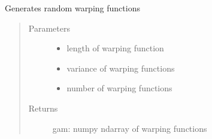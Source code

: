 \documentclass[letterpaper,10pt,english]{sphinxmanual}
\begin{document}

\begin{fulllineitems}
\label{\detokenize{utility_functions:utility_functions.rgam}}
Generates random warping functions
\begin{quote}\begin{description}
\item[{Parameters}] \leavevmode\begin{itemize}
\item {} 
 \textendash{} length of warping function

\item {} 
 \textendash{} variance of warping functions

\item {} 
 \textendash{} number of warping functions

\end{itemize}

\item[{Returns}] \leavevmode
gam: numpy ndarray of warping functions

\end{description}\end{quote}

\end{fulllineitems}

\end{document}
